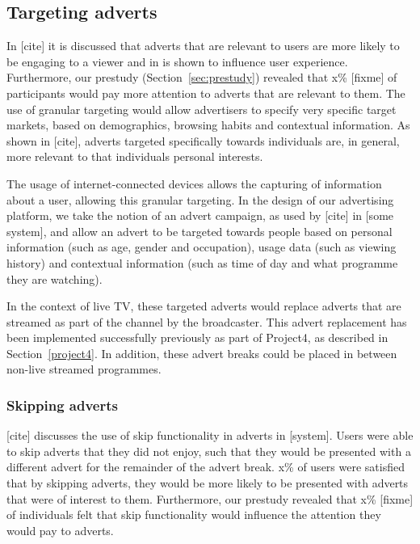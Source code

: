 \subsection{Targeting adverts}
	\label{sec:design_adverts}

	In [cite] it is discussed that adverts that are relevant to users are more likely to be engaging to a viewer and in \citet{yahoo-intrusive-advertising} is shown to influence user experience. Furthermore, our prestudy (Section~\ref{sec:prestudy}) revealed that x\% [fixme] of participants would pay more attention to adverts that are relevant to them. The use of granular targeting would allow advertisers to specify very specific target markets, based on demographics, browsing habits and contextual information. As shown in [cite], adverts targeted specifically towards individuals are, in general, more relevant to that individuals personal interests.

	The usage of internet-connected devices allows the capturing of information about a user, allowing this granular targeting. In the design of our advertising platform, we take the notion of an advert campaign, as used by [cite] in [some system], and allow an advert to be targeted towards people based on personal information (such as age, gender and occupation), usage data (such as viewing history) and contextual information (such as time of day and what programme they are watching).

	In the context of live TV, these targeted adverts would replace adverts that are streamed as part of the channel by the broadcaster. This advert replacement has been implemented successfully previously as part of Project4, as described in Section~\ref{project4}. In addition, these advert breaks could be placed in between non-live streamed programmes.

	\subsubsection{Skipping adverts}

	[cite] discusses the use of skip functionality in adverts in [system]. Users were able to skip adverts that they did not enjoy, such that they would be presented with a different advert for the remainder of the advert break. x\% of users were satisfied that by skipping adverts, they would be more likely to be presented with adverts that were of interest to them. Furthermore, our prestudy revealed that x\% [fixme] of individuals felt that skip functionality would influence the attention they would pay to adverts. 

